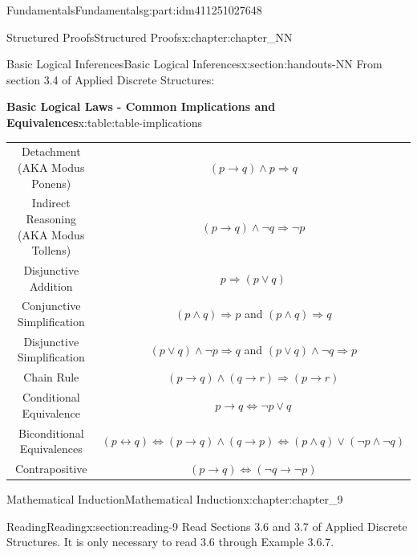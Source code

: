 \documentclass[oneside,10pt,]{book}
\newcommand{\tabularfont}{\relax}
\numberwithin{equation}{section}
\newcommand{\hrulemedium}{\noalign{\hrule height 0.07em}}
\begin{document}
\begin{partptx}{Fundamentals}{}{Fundamentals}{}{}{g:part:idm411251027648}
\begin{chapterptx}{Structured Proofs}{}{Structured Proofs}{}{}{x:chapter:chapter_NN}
\typeout{************************************************}
%
\begin{sectionptx}{Basic Logical Inferences}{}{Basic Logical Inferences}{}{}{x:section:handouts-NN}
From section 3.4 of Applied Discrete Structures:%
\begin{tableptx}{\textbf{Basic Logical Laws - Common Implications and Equivalences}}{x:table:table-implications}{}%
\centering
{}%
%
%
%
{\tabularfont%
\begin{tabular}{cc}
Detachment (AKA Modus Ponens)&\((p \rightarrow  q) \land  p\Rightarrow  q\)\tabularnewline\hrulemedium
Indirect Reasoning (AKA Modus Tollens)&\((p \to  q) \land  \neg q \Rightarrow  \neg p\)\tabularnewline\hrulemedium
Disjunctive Addition&\(p\Rightarrow (p\lor q)\)\tabularnewline\hrulemedium
Conjunctive Simplification&\((p \land  q) \Rightarrow  p\) and \((p \land  q) \Rightarrow  q\)\tabularnewline\hrulemedium
Disjunctive Simplification&\((p \lor  q) \land  \neg p \Rightarrow  q\) and \((p \lor q) \land \neg q\Rightarrow p\)\tabularnewline\hrulemedium
Chain Rule&\((p \to  q) \land  ( q \rightarrow  r) \Rightarrow  (p\to  r)\)\tabularnewline\hrulemedium
Conditional Equivalence&\(p \rightarrow  q \Leftrightarrow  \neg p \lor  q\)\tabularnewline\hrulemedium
Biconditional Equivalences&\((p \leftrightarrow  q) \Leftrightarrow  (p\rightarrow q) \land  (q \rightarrow  p)\Leftrightarrow (p \land  q) \lor  (\neg p \land  \neg q)\)\tabularnewline\hrulemedium
Contrapositive&\((p\to q) \Leftrightarrow (\neg q \to \neg p)\)
\end{tabular}
}%
\end{tableptx}%
\end{sectionptx}
\end{chapterptx}
%
\typeout{************************************************}
\typeout{************************************************}
%
\begin{chapterptx}{Mathematical Induction}{}{Mathematical Induction}{}{}{x:chapter:chapter_9}
\index{}%
%
%
\typeout{************************************************}
\typeout{************************************************}
%
\begin{sectionptx}{Reading}{}{Reading}{}{}{x:section:reading-9}
Read Sections 3.6 and 3.7 of Applied Discrete Structures. It is only necessary to read 3.6 through Example 3.6.7.%

\end{sectionptx}
\end{chapterptx}
\end{partptx}
\end{document}
